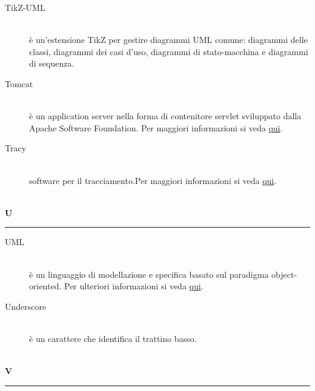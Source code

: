 \documentclass[12pt,a4paper]{article}
\begin{document}
\begin{description}
\item[TikZ-UML] 
\hfill\\è un'estensione TikZ per gestire diagrammi UML comune: diagrammi delle classi, diagrammi dei casi d'uso, diagrammi di stato-macchina e diagrammi di sequenza.

\item[Tomcat] 
\hfill\\è un application server nella forma di contenitore servlet  sviluppato dalla Apache Software Foundation. Per maggiori informazioni si veda \href{https://it.wikipedia.org/wiki/Apache_Tomcat}{qui}.

\item[Tracy] 
\hfill\\software {} per il tracciamento.Per maggiori informazioni si veda \href{http://tracy-tpiga.rhcloud.com/tracy/}{qui}.
\end{description}

\newpage

\begin{center}
\hfill\\
	\LARGE \textbf{U}
\hfill\\
\rule[15pt]{30pt}{0.5pt}
\end{center}

\begin{description}
\item[UML] 
\hfill\\è un linguaggio di modellazione e specifica basato sul paradigma object-oriented. Per ulteriori informazioni si veda \href{http://it.wikipedia.org/wiki/Unified_Modeling_Language}{qui}.

\item[Underscore] 
\hfill\\è un carattere che identifica il trattino basso.
\end{description}

\newpage

\begin{center}
\hfill\\
	\LARGE \textbf{V}
\hfill\\
\rule[15pt]{30pt}{0.5pt}
\end{center}
\end{document}
